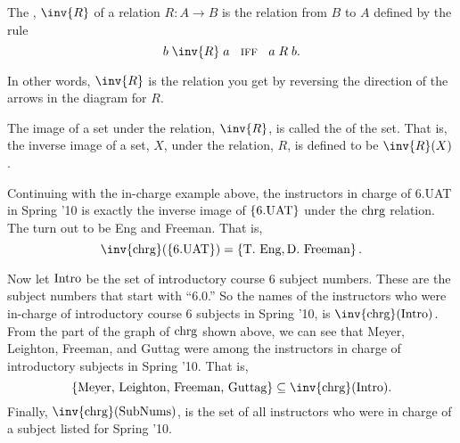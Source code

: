 \begin{definition}
The , $\inv{R}$ of a relation $R: A \to B$ is the
relation from $B$ to $A$ defined by the rule
\[
b \mrel{\inv{R}} a\ \ \QIFF\ \ a \mrel{R} b.
\]
\end{definition}
In other words, $\inv{R}$ is the relation you get by reversing the
direction of the arrows in the diagram for $R$.

\begin{definition}
The image of a set under the relation, $\inv{R}$, is called
the  of the set.  That is, the inverse image of a
set, $X$, under the relation, $R$, is defined to be $\inv{R}(X)$.
\end{definition}

Continuing with the in-charge example above, the instructors
in charge of 6.UAT in Spring '10 is exactly the inverse image of
$\left\{\text{6.UAT}\right\}$ under the $\text{chrg}$ relation.  The turn out to be Eng
and Freeman.  That is,
\[
\inv{\inchrg}(\set{\text{6.UAT}}) = \set{\text{T. Eng}, \text{D. Freeman}}.
\]

Now let $\text{Intro}$ be the set of introductory course 6 subject
numbers.  These are the subject numbers that start with ``6.0.''  So
the names of the instructors who were in-charge of introductory course 6
subjects in Spring '10, is $\inv{\inchrg}(\introsub)$.  From the part of
the graph of $\text{chrg}$ shown above, we can see that Meyer, Leighton,
Freeman, and Guttag were among the instructors in charge of introductory
subjects in Spring '10.  That is,
\[
\set{\text{Meyer, Leighton, Freeman, Guttag}} \subseteq \inv{\inchrg}(\introsub).
\]
Finally, $\inv{\inchrg}(\subnums)$, is the set of all instructors who
were in charge of a subject listed for Spring '10.

\iffalse
It gets interesting when we write composite expressions mixing images,
inverse images and set operations.  For example, $T(\inv{T}(D))$ is
the set of Spring '09 subjects that have an instructor in charge who
also is in in charge of an introductory subject.  So $T(\inv{T}(D)) -
D$ are the advanced subjects with someone in-charge who is also
in-charge of an introductory subject.  Similarly, $\inv{T}(D) \intersect
\inv{T}(N-D)$ is the set of faculty in charge of both an introductory \emph{and}
an advanced subject in Spring '09.
\fi

\begin{problems}
\practiceproblems
{}

\classproblems
{}

\homeworkproblems
{}

\classproblems
{}

\end{problems}

